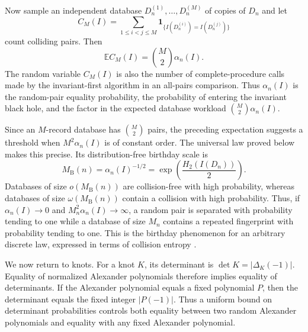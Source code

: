 \documentclass[9pt,twoside]{pnas-new}
\theoremstyle{definition}
\theoremstyle{remark}
\begin{document}
Now sample an independent database $D_n^{(1)},\ldots,D_n^{(M)}$ of copies of $D_n$ and let
\[
 C_M(I)=\sum_{1\le i<j\le M}
 \mathbf 1_{\{I(D_n^{(i)})=I(D_n^{(j)})\}}
\]
count colliding pairs.  Then
\begin{equation}
 \mathbb E C_M(I)=\binom M2\alpha_n(I).
 \label{eq:opening-workload}
\end{equation}
The random variable $C_M(I)$ is also the number of complete-procedure calls made by the invariant-first algorithm in an all-pairs comparison. Thus $\alpha_n(I)$ is the random-pair equality probability, the probability of entering the invariant black hole, and the factor in the expected database workload $\binom M2\alpha_n(I)$.

Since an $M$-record database has $\binom M2$ pairs, the preceding expectation suggests a threshold when $M^2\alpha_n(I)$ is of constant order. The universal law proved below makes this precise. Its distribution-free birthday scale is
\begin{equation}
 M_{\mathrm B}(n)=\alpha_n(I)^{-1/2}
 =\exp\!\left(\frac{H_2(I(D_n))}{2}\right).
 \label{eq:opening-birthday-scale}
\end{equation}
Databases of size $o(M_{\mathrm B}(n))$ are collision-free with high probability, whereas databases of size $\omega(M_{\mathrm B}(n))$ contain a collision with high probability. Thus, if $\alpha_n(I)\to0$ and $M_n^2\alpha_n(I)\to\infty$, a random pair is separated with probability tending to one while a database of size $M_n$ contains a repeated fingerprint with probability tending to one. This is the birthday phenomenon for an arbitrary discrete law, expressed in terms of collision entropy \cite{diaconismosteller1989,kimmontenegroperestetali2010}.

We now return to knots. For a knot $K$, its determinant is $\det K=|\Delta_K(-1)|$. Equality of normalized Alexander polynomials therefore implies equality of determinants. If the Alexander polynomial equals a fixed polynomial $P$, then the determinant equals the fixed integer $|P(-1)|$. Thus a uniform bound on determinant probabilities controls both equality between two random Alexander polynomials and equality with any fixed Alexander polynomial.
\end{document}
